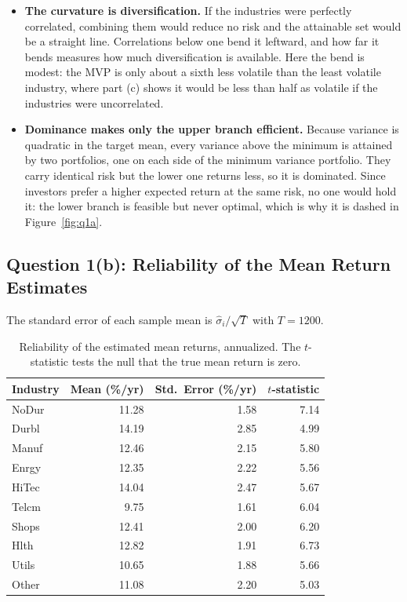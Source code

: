 \documentclass[11pt]{article}
\begin{document}
\begin{itemize}
\setlength{\itemsep}{3pt}\setlength{\parskip}{0pt}

\item \textbf{The curvature is diversification.} If the industries were
perfectly correlated, combining them would reduce no risk and the attainable
set would be a straight line. Correlations below one bend it leftward, and how
far it bends measures how much diversification is available. Here the bend is
modest: the MVP is only about a sixth less volatile than the least volatile
industry, where part (c) shows it would be less than half as volatile if the
industries were uncorrelated.

\item \textbf{Dominance makes only the upper branch efficient.} Because
variance is quadratic in the target mean, every variance above the minimum is
attained by two portfolios, one on each side of the minimum variance
portfolio. They carry identical risk but the lower one returns less, so it is
dominated. Since investors prefer a higher expected return at the same risk,
no one would hold it: the lower branch is feasible but never optimal, which is
why it is dashed in Figure~\ref{fig:q1a}.

\end{itemize}

\subsection{Question 1(b): Reliability of the Mean Return Estimates}

The standard error of each sample mean is $\hat\sigma_i/\sqrt{T}$ with
$T = 1200$.

\begin{table}[H]
\centering
\caption{Reliability of the estimated mean returns, annualized. The
$t$-statistic tests the null that the true mean return is zero.}
\small
\begin{tabular}{lrrr}
\toprule
Industry & Mean (\%/yr) & Std.\ Error (\%/yr) & $t$-statistic \\
\midrule
NoDur & 11.28 & 1.58 & 7.14 \\
Durbl & 14.19 & 2.85 & 4.99 \\
Manuf & 12.46 & 2.15 & 5.80 \\
Enrgy & 12.35 & 2.22 & 5.56 \\
HiTec & 14.04 & 2.47 & 5.67 \\
Telcm & 9.75 & 1.61 & 6.04 \\
Shops & 12.41 & 2.00 & 6.20 \\
Hlth & 12.82 & 1.91 & 6.73 \\
Utils & 10.65 & 1.88 & 5.66 \\
Other & 11.08 & 2.20 & 5.03 \\
\bottomrule
\end{tabular}
\label{tab:q1b_rel}
\end{table}
\end{document}
